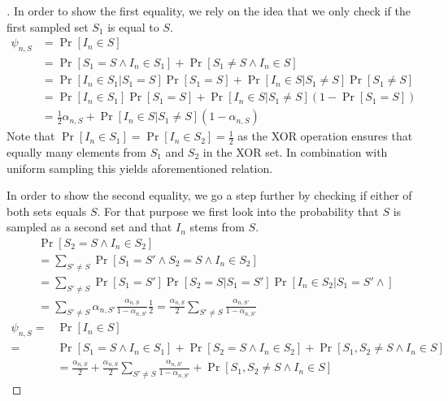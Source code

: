 \begin{proof}[]
  In order to show the first equality, we rely on the idea that we only check
  if the first sampled set $S_1$ is equal to $S$.
  \begin{align}
    \psi_{n, S} &= \Pr[I_n \in S] \\
      &= \Pr[S_1 = S \wedge I_n \in S_1] + \Pr[S_1 \neq S \wedge I_n \in S] \\
      &= \Pr[I_n \in S_1 | S_1 = S] \Pr[S_1 = S] + \Pr[I_n \in S| S_1 \neq
          S]\Pr[S_1 \neq S] \\
      &= \Pr[I_n \in S_1] \Pr[S_1 = S] + \Pr[I_n \in S| S_1 \neq S](1 - \Pr[S_1
          = S]) \\
      &= \frac{1}{2} \alpha_{n, S} +  \Pr[I_n \in S | S_1 \neq S] (1 -
          \alpha_{n, S})
  \end{align}
  Note that $\Pr[I_n \in S_1] = \Pr[I_n \in S_2] = \frac{1}{2}$ as the XOR
  operation ensures that equally many elements from $S_1$ and $S_2$ in the XOR
  set. In combination with uniform sampling this yields aforementioned relation.

  In order to show the second equality, we go a step further by checking if
  either of both sets equals $S$. For that purpose we first look into the
  probability that $S$ is sampled as a second set and that $I_n$ stems from $S$.
  \begin{align}
    & \Pr[S_2 = S \wedge I_n \in S_2] \\
    &= \sum_{S'\neq S}\Pr[S_1 = S' \wedge S_2 = S \wedge I_n \in S_2] \\
    &= \sum_{S'\neq S} \Pr[S_1 = S'] \Pr[S_2 = S | S_1 = S'] \Pr[I_n \in S_2 |
        S_1 = S' \wedge] \\
    &= \sum_{S'\neq S} \alpha_{n, S'} \frac{\alpha_{n, S}}{1 - \alpha_{n, S'}}
        \frac{1}{2} = \frac{\alpha_{n, S}}{2} \sum_{S'\neq S} \frac{\alpha_{n,
        S'}}{1 - \alpha_{n, S'}}
  \end{align}
  \begin{align}
    \psi_{n, S} =& \Pr[I_n \in S] \\
      =& \Pr[S_1 = S \wedge I_n \in S_1] + \Pr[S_2 = S \wedge I_n \in S_2] +
          \Pr[S_1, S_2 \neq S \wedge I_n \in S] \\
      &= \frac{\alpha_{n, S}}{2} +  \frac{\alpha_{n, S}}{2} \sum_{S'\neq S}
          \frac{\alpha_{n, S'}}{1 - \alpha_{n, S'}} + \Pr[S_1, S_2 \neq S
          \wedge I_n \in S]
    \end{align}
\end{proof}


